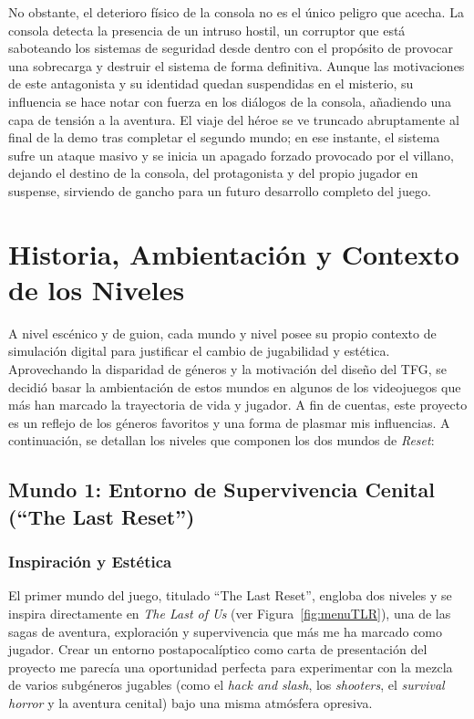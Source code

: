 No obstante, el deterioro físico de la consola no es el único peligro que acecha. La consola detecta la presencia de un intruso hostil, un corruptor que está saboteando los sistemas de seguridad desde dentro con el propósito de provocar una sobrecarga y destruir el sistema de forma definitiva. Aunque las motivaciones de este antagonista y su identidad quedan suspendidas en el misterio, su influencia se hace notar con fuerza en los diálogos de la consola, añadiendo una capa de tensión a la aventura. El viaje del héroe se ve truncado abruptamente al final de la demo tras completar el segundo mundo; en ese instante, el sistema sufre un ataque masivo y se inicia un apagado forzado provocado por el villano, dejando el destino de la consola, del protagonista y del propio jugador en suspense, sirviendo de gancho para un futuro desarrollo completo del juego.






\section{Historia, Ambientación y Contexto de los Niveles}
\label{sec:historia_niveles}

A nivel escénico y de guion, cada mundo y nivel posee su propio contexto de simulación digital para justificar el cambio de jugabilidad y estética. Aprovechando la disparidad de géneros y la motivación del diseño del TFG, se decidió basar la ambientación de estos mundos en algunos de los videojuegos que más han marcado la trayectoria de vida y jugador. A fin de cuentas, este proyecto es un reflejo de los géneros favoritos y una forma de plasmar mis influencias. A continuación, se detallan los niveles que componen los dos mundos de \textit{Reset}:

\subsection{Mundo 1: Entorno de Supervivencia Cenital (``The Last Reset'')}
\label{subsec:mundo1}

\subsubsection{Inspiración y Estética}
El primer mundo del juego, titulado ``The Last Reset'', engloba dos niveles y se inspira directamente en \textit{The Last of Us} (ver Figura~\ref{fig:menuTLR}), una de las sagas de aventura, exploración y supervivencia que más me ha marcado como jugador. Crear un entorno postapocalíptico como carta de presentación del proyecto me parecía una oportunidad perfecta para experimentar con la mezcla de varios subgéneros jugables (como el \textit{hack and slash}, los \textit{shooters}, el \textit{survival horror} y la aventura cenital) bajo una misma atmósfera opresiva.

